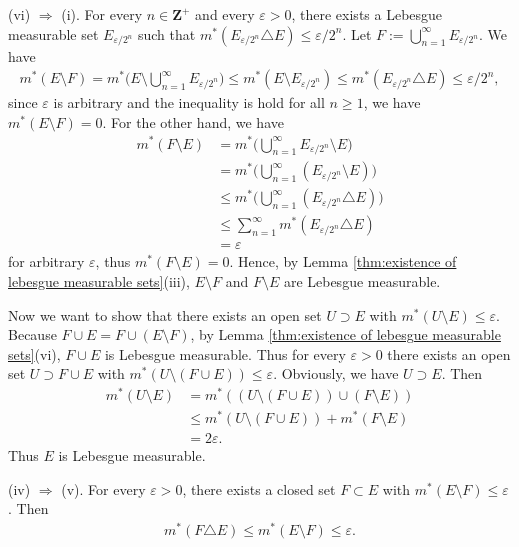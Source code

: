 \documentclass{book}
\theoremstyle{defstyle}
\theoremstyle{thmstyle}
\begin{document}
(vi) $\Rightarrow$ (i). For every $n \in \mathbf{Z}^+$ and every $\varepsilon > 0$, there exists a Lebesgue measurable set $E_{\varepsilon/2^n}$ such that $m^*(E_{\varepsilon/2^n} \triangle E) \leq \varepsilon/2^n$. Let $F := \bigcup_{n = 1}^{\infty}E_{\varepsilon/2^n}$. We have
    \begin{align*}
        m^*(E \setminus F) = m^*\Big(E \setminus \bigcup_{n = 1}^{\infty}E_{\varepsilon/2^n}\Big)
        \leq m^*(E \setminus E_{\varepsilon/2^n})
        \leq m^*(E_{\varepsilon/2^n} \triangle E)
        \leq \varepsilon/2^n,
    \end{align*}
since $\varepsilon$ is arbitrary and the inequality is hold for all $n \geq 1$, we have $m^*(E \setminus F) = 0$. For the other hand, we have
    \begin{align*}
        m^*(F \setminus E)
        &= m^*\Big(\bigcup_{n = 1}^{\infty}E_{\varepsilon/2^n} \setminus E\Big)\\
        &= m^*\Big(\bigcup_{n = 1}^{\infty}(E_{\varepsilon/2^n} \setminus E)\Big)\\
        &\leq m^*\Big(\bigcup_{n = 1}^{\infty}(E_{\varepsilon/2^n} \triangle E)\Big)\\
        &\leq \sum_{n = 1}^{\infty}m^*(E_{\varepsilon/2^n} \triangle E)\\
        &= \varepsilon
    \end{align*}
for arbitrary $\varepsilon$, thus $m^*(F \setminus E) = 0$. Hence, by Lemma \ref{thm:existence of lebesgue measurable sets}(iii), $E \setminus F$ and $F \setminus E$ are Lebesgue measurable.

Now we want to show that there exists an open set $U \supset E$ with $m^*(U \setminus E) \leq \varepsilon$. Because $F \cup E = F \cup (E \setminus F)$, by Lemma \ref{thm:existence of lebesgue measurable sets}(vi), $F \cup E$ is Lebesgue measurable. Thus for every $\varepsilon > 0$ there exists an open set $U \supset F \cup E$ with $m^*(U \setminus (F \cup E)) \leq \varepsilon$. Obviously, we have $U \supset E$. Then
    \begin{align*}
        m^*(U \setminus E)
        &= m^*((U \setminus (F \cup E)) \cup (F \setminus E))\\
        &\leq m^*(U \setminus (F \cup E)) + m^*(F \setminus E)\\
        &= 2\varepsilon.
    \end{align*}
Thus $E$ is Lebesgue measurable.

(iv) $\Rightarrow$ (v). For every $\varepsilon > 0$, there exists a closed set $F \subset E$ with $m^*(E \setminus F) \leq \varepsilon$. Then
    \begin{align*}
        m^*(F \triangle E) \leq m^*(E \setminus F) \leq \varepsilon.
    \end{align*}
\end{document}
